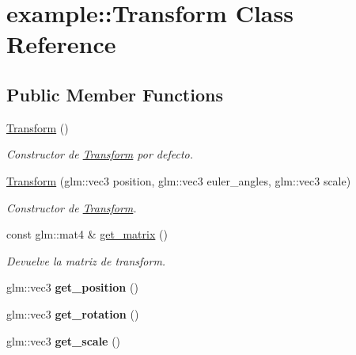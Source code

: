 \hypertarget{classexample_1_1_transform}{}\section{example\+::Transform Class Reference}
\label{classexample_1_1_transform}
\subsection*{Public Member Functions}
\begin{DoxyCompactItemize}
\item 
\mbox{\hyperlink{classexample_1_1_transform_a46be94fa65b39ee9ffca7dadcf2af4eb}{Transform}} ()
\begin{DoxyCompactList}\small\item\em Constructor de \mbox{\hyperlink{classexample_1_1_transform}{Transform}} por defecto. \end{DoxyCompactList}\item 
\mbox{\hyperlink{classexample_1_1_transform_a19448445e6cfa9c54f9d18169e6be903}{Transform}} (glm\+::vec3 position, glm\+::vec3 euler\+\_\+angles, glm\+::vec3 scale)
\begin{DoxyCompactList}\small\item\em Constructor de \mbox{\hyperlink{classexample_1_1_transform}{Transform}}. \end{DoxyCompactList}\item 
const glm\+::mat4 \& \mbox{\hyperlink{classexample_1_1_transform_a9d28491bfefe00ebe8180bffe40896e2}{get\+\_\+matrix}} ()
\begin{DoxyCompactList}\small\item\em Devuelve la matriz de transform. \end{DoxyCompactList}\item 
\mbox{\label{classexample_1_1_transform_a74dbc1eee1a67a039ffcb78b0c5207ab}} 
glm\+::vec3 {\bfseries get\+\_\+position} ()
\item 
\mbox{\label{classexample_1_1_transform_ab150ef3d4563d18222abd9df2ba54a13}} 
glm\+::vec3 {\bfseries get\+\_\+rotation} ()
\item 
\mbox{\label{classexample_1_1_transform_ac19e852f229f8357019338fce70c551f}} 
glm\+::vec3 {\bfseries get\+\_\+scale} ()
\item 

\end{DoxyCompactItemize}

